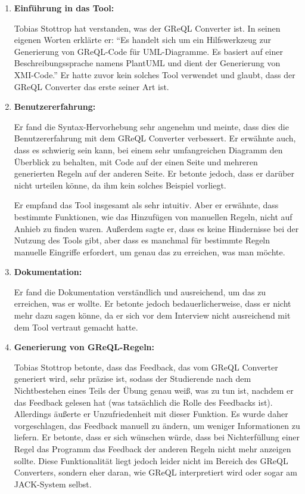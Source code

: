 \begin{enumerate}[itemsep=8pt, parsep=5pt]
    \item \textbf{Einführung in das Tool:}

    Tobias Stottrop hat verstanden, was der GReQL Converter ist. In seinen eigenen Worten erklärte er:
    ``Es handelt sich um ein Hilfswerkzeug zur Generierung von GReQL-Code für UML-Diagramme. Es basiert auf einer
    Beschreibungssprache namens PlantUML und dient der Generierung von XMI-Code.'' Er hatte zuvor kein solches Tool
    verwendet und glaubt, dass der GReQL Converter das erste seiner Art ist.

    \item \textbf{Benutzererfahrung:}

    Er fand die Syntax-Hervorhebung sehr angenehm und meinte, dass dies die Benutzererfahrung mit dem GReQL Converter
    verbessert. Er erwähnte auch, dass es schwierig sein kann, bei einem sehr umfangreichen Diagramm den Überblick
    zu behalten, mit Code auf der einen Seite und mehreren generierten Regeln auf der anderen Seite. Er betonte jedoch,
    dass er darüber nicht urteilen könne, da ihm kein solches Beispiel vorliegt.

    Er empfand das Tool insgesamt als sehr intuitiv. Aber er erwähnte, dass bestimmte Funktionen, wie das Hinzufügen von
    manuellen Regeln, nicht auf Anhieb zu finden waren. Außerdem sagte er, dass es keine Hindernisse bei der Nutzung des
    Tools gibt, aber dass es manchmal für bestimmte Regeln manuelle Eingriffe erfordert, um genau das zu erreichen, was
    man möchte.

    \item \textbf{Dokumentation:}

    Er fand die Dokumentation verständlich und ausreichend, um das zu erreichen, was er wollte. Er betonte jedoch
    bedauerlicherweise, dass er nicht mehr dazu sagen könne, da er sich vor dem Interview nicht ausreichend mit dem
    Tool vertraut gemacht hatte.


    \item \textbf{Generierung von GReQL-Regeln:}

    Tobias Stottrop betonte, dass das Feedback, das vom GReQL Converter generiert wird, sehr präzise ist, sodass der
    Studierende nach dem Nichtbestehen eines Teils der Übung genau weiß, was zu tun ist, nachdem er das Feedback gelesen
    hat (was tatsächlich die Rolle des Feedbacks ist). Allerdings äußerte er Unzufriedenheit mit dieser Funktion. Es
    wurde daher vorgeschlagen, das Feedback manuell zu ändern, um weniger Informationen zu liefern. Er betonte, dass er
    sich wünschen würde, dass bei Nichterfüllung einer Regel das Programm das Feedback der anderen Regeln nicht mehr
    anzeigen sollte. Diese Funktionalität liegt jedoch leider nicht im Bereich des GReQL Converters, sondern eher daran,
    wie GReQL interpretiert wird oder sogar am JACK-System selbst.


\end{enumerate}
